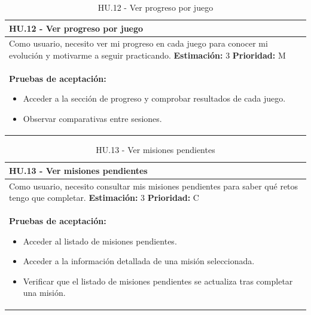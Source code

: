 \begin{table}[H]
\centering
\begin{tabularx}{\textwidth}{|X|}
\hline
\textbf{HU.12 - Ver progreso por juego}  \\
\hline
Como usuario, necesito ver mi progreso en cada juego para conocer mi evolución y motivarme a seguir practicando.
\clearpage
\textbf{Estimación: }3
\clearpage
\textbf{Prioridad: }M
\\
\hline
\textbf{Pruebas de aceptación:}
\begin{itemize}
    \item Acceder a la sección de progreso y comprobar resultados de cada juego.
    \item Observar comparativas entre sesiones.
\end{itemize}
\\
\hline
\end{tabularx}
\caption{HU.12 - Ver progreso por juego}
\end{table}

\begin{table}[H]
\centering
\begin{tabularx}{\textwidth}{|X|}
\hline
\textbf{HU.13 - Ver misiones pendientes}  \\
\hline
Como usuario, necesito consultar mis misiones pendientes para saber qué retos tengo que completar.
\clearpage
\textbf{Estimación: }3
\clearpage
\textbf{Prioridad: }C
\\
\hline
\textbf{Pruebas de aceptación:}
\begin{itemize}
    \item Acceder al listado de misiones pendientes.
    \item Acceder a la información detallada de una misión seleccionada.
    \item Verificar que el listado de misiones pendientes se actualiza tras completar una misión.
\end{itemize}
\\
\hline
\end{tabularx}
\caption{HU.13 - Ver misiones pendientes}
\end{table}

